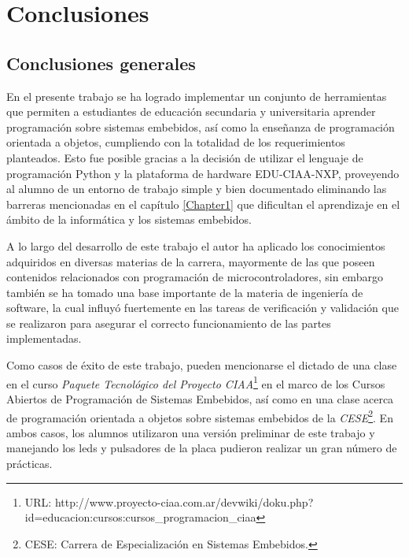 
\chapter{Conclusiones} %

\label{Chapter5} %




\section{Conclusiones generales }

En el presente trabajo se ha logrado implementar un conjunto de herramientas que permiten a estudiantes  de educación secundaria y universitaria aprender programación sobre sistemas embebidos, así como la enseñanza de programación orientada a objetos, cumpliendo con la totalidad de los requerimientos planteados. Esto fue posible gracias a la decisión de utilizar el lenguaje de programación Python y la plataforma de hardware EDU-CIAA-NXP, proveyendo al alumno de un entorno de trabajo simple y bien documentado eliminando las barreras mencionadas en el capítulo \ref{Chapter1} que dificultan el aprendizaje en el ámbito de la informática y los sistemas embebidos.

A lo largo del desarrollo de este trabajo el autor ha aplicado los conocimientos adquiridos en diversas materias de la carrera, mayormente de las que poseen contenidos relacionados con programación de microcontroladores, sin embargo también se ha tomado una base importante de la materia de ingeniería de software, la cual influyó fuertemente en las tareas de verificación y validación que se realizaron para asegurar el correcto funcionamiento de las partes implementadas.

Como casos de éxito de este trabajo, pueden mencionarse el dictado de una clase en el curso \textit{Paquete Tecnológico del Proyecto CIAA}\footnote{URL: http://www.proyecto-ciaa.com.ar/devwiki/doku.php?id=educacion:cursos:cursos\_programacion\_ciaa} en el marco de los Cursos Abiertos de Programación de Sistemas Embebidos, así como en una clase acerca de programación orientada a objetos sobre sistemas embebidos de la \textit{CESE}\footnote{CESE: Carrera de Especialización en Sistemas Embebidos.}. En ambos casos, los alumnos utilizaron una versión preliminar de este trabajo y manejando los leds y pulsadores de la placa pudieron realizar un gran número de prácticas.

